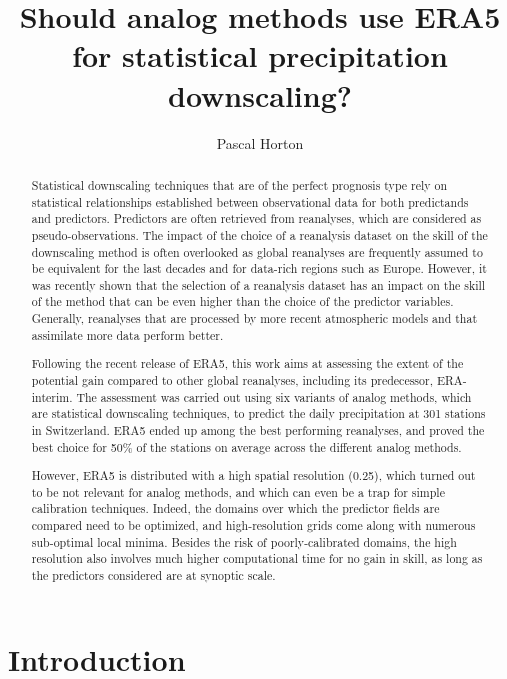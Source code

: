 \documentclass[alpha-refs]{wiley-article}
\title{Should analog methods use ERA5 for statistical precipitation downscaling? }
\author[1]{Pascal Horton}
\affil[1]{Oeschger Centre for Climate Change Research and Institute of Geography, University of Bern, Bern, Switzerland}
\begin{document}
\maketitle

\begin{abstract}
Statistical downscaling techniques that are of the perfect prognosis type rely on statistical relationships established between observational data for both predictands and predictors. Predictors are often retrieved from reanalyses, which are considered as pseudo-observations. The impact of the choice of a reanalysis dataset on the skill of the downscaling method is often overlooked as global reanalyses are frequently assumed to be equivalent for the last decades and for data-rich regions such as Europe. However, it was recently shown that the selection of a reanalysis dataset has an impact on the skill of the method that can be even higher than the choice of the predictor variables. Generally, reanalyses that are processed by more recent atmospheric models and that assimilate more data perform better. 

Following the recent release of ERA5, this work aims at assessing the extent of the potential gain compared to other global reanalyses, including its predecessor, ERA-interim. The assessment was carried out using six variants of analog methods, which are statistical downscaling techniques, to predict the daily precipitation at 301 stations in Switzerland. ERA5 ended up among the best performing reanalyses, and proved the best choice for 50\% of the stations on average across the different analog methods. 

However, ERA5 is distributed with a high spatial resolution (0.25\degree), which turned out to be not relevant for analog methods, and which can even be a trap for simple calibration techniques. Indeed, the domains over which the predictor fields are compared need to be optimized, and high-resolution grids come along with numerous sub-optimal local minima. Besides the risk of poorly-calibrated domains, the high resolution also involves much higher computational time for no gain in skill, as long as the predictors considered are at synoptic scale.


\end{abstract}

\section{Introduction}
\end{document}
